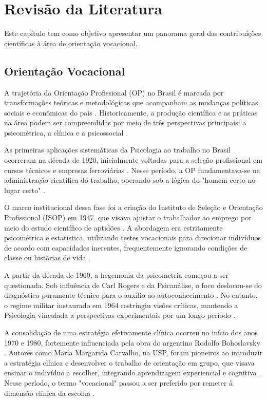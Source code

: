 \chapter{Revisão da Literatura} \label{cha:revisao}

Este capítulo tem como objetivo apresentar um panorama geral das contribuições científicas à área de orientação vocacional.

\section{Orientação Vocacional}

A trajetória da Orientação Profissional (OP) no Brasil é marcada por transformações teóricas e metodológicas que acompanham as mudanças políticas, sociais e econômicas do país \cite{abade2005}. Historicamente, a produção científica e as práticas na área podem ser compreendidas por meio de três perspectivas principais: a psicométrica, a clínica e a psicossocial \cite{abade2005}.

As primeiras aplicações sistemáticas da Psicologia ao trabalho no Brasil ocorreram na década de 1920, inicialmente voltadas para a seleção profissional em cursos técnicos e empresas ferroviárias \cite{abade2005}. Nesse período, a OP fundamentava-se na administração científica do trabalho, operando sob a lógica do "homem certo no lugar certo" \cite{abade2005}.

O marco institucional dessa fase foi a criação do Instituto de Seleção e Orientação Profissional (ISOP) em 1947, que visava ajustar o trabalhador ao emprego por meio do estudo científico de aptidões \cite{abade2005}. A abordagem era estritamente psicométrica e estatística, utilizando testes vocacionais para direcionar indivíduos de acordo com capacidades inerentes, frequentemente ignorando condições de classe ou histórias de vida \cite{abade2005}.

A partir da década de 1960, a hegemonia da psicometria começou a ser questionada. Sob influência de Carl Rogers e da Psicanálise, o foco deslocou-se do diagnóstico puramente técnico para o auxílio ao autoconhecimento \cite{abade2005}. No entanto, o regime militar instaurado em 1964 restringiu visões críticas, mantendo a Psicologia vinculada a perspectivas experimentais por um longo período \cite{abade2005}.

A consolidação de uma estratégia efetivamente clínica ocorreu no início dos anos 1970 e 1980, fortemente influenciada pela obra do argentino Rodolfo Bohoslavsky \cite{abade2005}. Autores como Maria Margarida Carvalho, na USP, foram pioneiros ao introduzir a estratégia clínica e desenvolver o trabalho de orientação em grupo, que visava ensinar o indivíduo a escolher, integrando aprendizagem experiencial e cognitiva \cite{abade2005}. Nesse período, o termo "vocacional" passou a ser preferido por remeter à dimensão clínica da escolha \cite{abade2005}.

